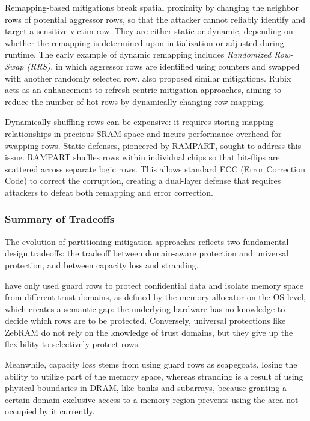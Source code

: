\documentclass[journal,twocolumn]{IEEEtran}
\begin{document}
Remapping-based mitigations break spatial proximity by changing the neighbor rows of potential aggressor rows, so that the attacker cannot reliably identify and target a sensitive victim row. They are either static or dynamic, depending on whether the remapping is determined upon initialization or adjusted during runtime. The early example of dynamic remapping includes \textit{Randomized Row-Swap (RRS)}\cite{Saileshwar22}, in which aggressor rows are identified using counters and swapped with another randomly selected row. \cite{Saxena22,Saxena24,Wi26} also proposed similar mitigations. Rubix\cite{Saxena24} acts as an enhancement to refresh-centric mitigation approaches, aiming to reduce the number of hot-rows by dynamically changing row mapping.

Dynamically shuffling rows can be expensive: it requires storing mapping relationships in precious SRAM space and incurs performance overhead for swapping rows. Static defenses, pioneered by RAMPART\cite{Woo24}, sought to address this issue. RAMPART shuffles rows within individual chips so that bit-flips are scattered across separate logic rows. This allows standard ECC (Error Correction Code) to correct the corruption, creating a dual-layer defense that requires attackers to defeat both remapping and error correction.

\subsubsection{Summary of Tradeoffs}

The evolution of partitioning mitigation approaches reflects two fundamental design tradeoffs: the tradeoff between domain-aware protection and universal protection, and between capacity loss and stranding.

\cite{Brasser16,Izzo18,Tatar18,Bock19,Loughlin23,Saxena24_2,M25} have only used guard rows to protect confidential data and isolate memory space from different trust domains, as defined by the memory allocator on the OS level, which creates a semantic gap: the underlying hardware has no knowledge to decide which rows are to be protected. Conversely, universal protections like ZebRAM\cite{Konoth18} do not rely on the knowledge of trust domains, but they give up the flexibility to selectively protect rows.

Meanwhile, capacity loss stems from using guard rows as scapegoats, losing the ability to utilize part of the memory space, whereas stranding is a result of using physical boundaries in DRAM, like banks and subarrays, because granting a certain domain exclusive access to a memory region prevents using the area not occupied by it currently.
\end{document}
